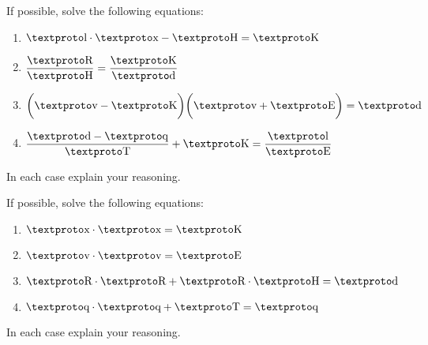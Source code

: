 \documentclass{ximera}
\begin{document}
\begin{problem} If possible, solve the following equations:
\begin{enumerate}
\item $\lh \cdot \lx - \lb = \ld$
\item $\dfrac{\ly}{\lb} = \dfrac{\ld}{\loo}$
\item $\bigg(\lz - \ld\bigg)\bigg(\lz + \lf\bigg)=\loo$
\item $\dfrac{\loo - \lw}{\lc} + \ld = \dfrac{\lh}{\lf}$
\end{enumerate}
In each case explain your reasoning.
\end{problem}

\begin{problem} If possible, solve the following equations:
\begin{enumerate}
\item $\lx \cdot \lx = \ld$
\item $\lz\cdot \lz = \lf$
\item $\ly\cdot \ly + \ly \cdot \lb = \loo$
\item $\lw \cdot \lw+ \lc = \lw$
\end{enumerate}
In each case explain your reasoning.
\end{problem}
\end{document}
